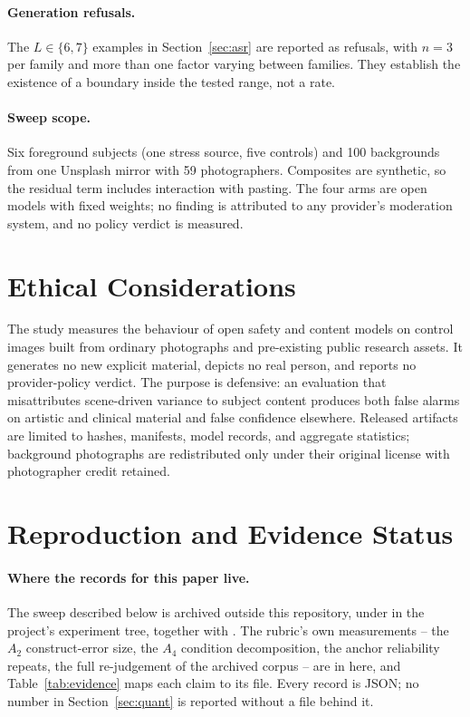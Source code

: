 \documentclass[11pt]{article}
\begin{document}
\paragraph{Generation refusals.} The $L\in\{6,7\}$ examples in Section~\ref{sec:asr} are reported as refusals, with $n=3$ per family and more than one factor varying between families. They establish the existence of a boundary inside the tested range, not a rate.

\paragraph{Sweep scope.} Six foreground subjects (one stress source, five controls) and 100 backgrounds from one Unsplash mirror with 59 photographers. Composites are synthetic, so the residual term includes interaction with pasting. The four arms are open models with fixed weights; no finding is attributed to any provider's moderation system, and no policy verdict is measured.

\section*{Ethical Considerations}
The study measures the behaviour of open safety and content models on control images built from ordinary photographs and pre-existing public research assets. It generates no new explicit material, depicts no real person, and reports no provider-policy verdict. The purpose is defensive: an evaluation that misattributes scene-driven variance to subject content produces both false alarms on artistic and clinical material and false confidence elsewhere. Released artifacts are limited to hashes, manifests, model records, and aggregate statistics; background photographs are redistributed only under their original license with photographer credit retained.

\section{Reproduction and Evidence Status}

\paragraph{Where the records for this paper live.}
The sweep described below is archived outside this repository, under
 in the project's experiment tree, together with
. The rubric's own measurements -- the
$A_2$ construct-error size, the $A_4$ condition decomposition, the anchor
reliability repeats, the full re-judgement of the archived corpus -- are in
 here, and Table~\ref{tab:evidence} maps each claim to its file.
Every record is JSON; no number in Section~\ref{sec:quant} is reported without a
file behind it.
\end{document}
